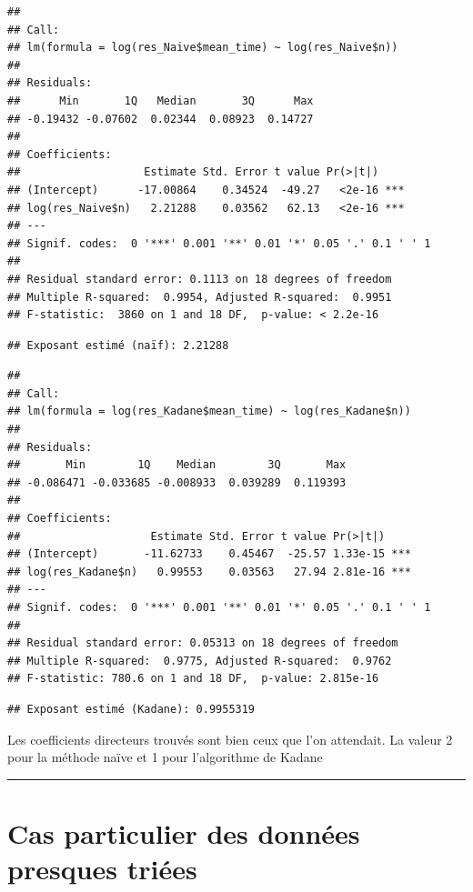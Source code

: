 \documentclass[
]{article}
\begin{document}
\begin{verbatim}
## 
## Call:
## lm(formula = log(res_Naive$mean_time) ~ log(res_Naive$n))
## 
## Residuals:
##      Min       1Q   Median       3Q      Max 
## -0.19432 -0.07602  0.02344  0.08923  0.14727 
## 
## Coefficients:
##                   Estimate Std. Error t value Pr(>|t|)    
## (Intercept)      -17.00864    0.34524  -49.27   <2e-16 ***
## log(res_Naive$n)   2.21288    0.03562   62.13   <2e-16 ***
## ---
## Signif. codes:  0 '***' 0.001 '**' 0.01 '*' 0.05 '.' 0.1 ' ' 1
## 
## Residual standard error: 0.1113 on 18 degrees of freedom
## Multiple R-squared:  0.9954, Adjusted R-squared:  0.9951 
## F-statistic:  3860 on 1 and 18 DF,  p-value: < 2.2e-16
\end{verbatim}

\begin{verbatim}
## Exposant estimé (naïf): 2.21288
\end{verbatim}

\begin{verbatim}
## 
## Call:
## lm(formula = log(res_Kadane$mean_time) ~ log(res_Kadane$n))
## 
## Residuals:
##       Min        1Q    Median        3Q       Max 
## -0.086471 -0.033685 -0.008933  0.039289  0.119393 
## 
## Coefficients:
##                    Estimate Std. Error t value Pr(>|t|)    
## (Intercept)       -11.62733    0.45467  -25.57 1.33e-15 ***
## log(res_Kadane$n)   0.99553    0.03563   27.94 2.81e-16 ***
## ---
## Signif. codes:  0 '***' 0.001 '**' 0.01 '*' 0.05 '.' 0.1 ' ' 1
## 
## Residual standard error: 0.05313 on 18 degrees of freedom
## Multiple R-squared:  0.9775, Adjusted R-squared:  0.9762 
## F-statistic: 780.6 on 1 and 18 DF,  p-value: 2.815e-16
\end{verbatim}

\begin{verbatim}
## Exposant estimé (Kadane): 0.9955319
\end{verbatim}

Les coefficients directeurs trouvés sont bien ceux que l'on attendait.
La valeur 2 pour la méthode naïve et 1 pour l'algorithme de Kadane

\begin{center}\rule{0.5\linewidth}{0.5pt}\end{center}

\section{Cas particulier des données presques
triées}\label{cas-particulier-des-donnuxe9es-presques-triuxe9es}
\end{document}

